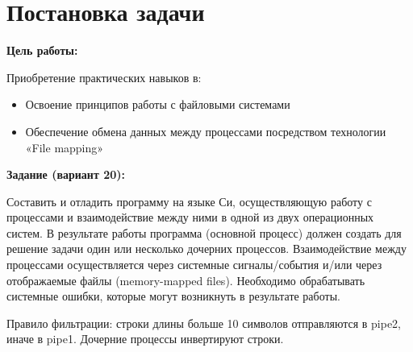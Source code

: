 \section{Постановка задачи}

{\bfseries Цель работы:} 

Приобретение практических навыков в:

\begin{itemize}
    \item Освоение принципов работы с файловыми системами
    \item Обеспечение обмена данных между процессами посредством технологии «File mapping»
\end{itemize}

{\bfseries Задание (вариант 20):} 

Составить и отладить программу на языке Си, осуществляющую работу с процессами и взаимодействие между ними в одной из двух операционных систем. В результате работы программа (основной процесс) должен создать для решение задачи один или несколько дочерних процессов. Взаимодействие между процессами осуществляется через системные сигналы/события и/или через отображаемые файлы (memory-mapped files).
Необходимо обрабатывать системные ошибки, которые могут возникнуть в результате работы.

Правило фильтрации: строки длины больше 10 символов отправляются в pipe2, иначе
в pipe1. Дочерние процессы инвертируют строки.

\pagebreak
